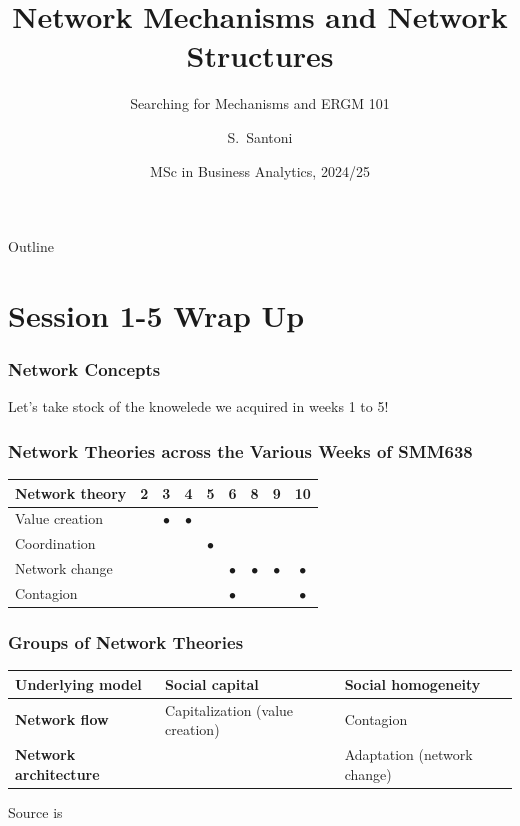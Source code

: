 \documentclass[show notes, aspectratio=1610]{beamer}
\title[Network Mechanisms]
{Network Mechanisms and Network Structures}
\subtitle{Searching for Mechanisms and ERGM 101}
\author{S.~Santoni\inst{1}}
\institute{
	\inst{1}%
	Bayes Business School
	}
\date{MSc in Business Analytics, 2024/25}
\begin{document}
\begin{frame}
	\titlepage
\end{frame}

\begin{frame}{Outline}
	\tableofcontents
\end{frame}

\section{Session 1-5 Wrap Up}

\begin{frame}
  \frametitle{Network Concepts}
  \centering
  \Large
  Let's take stock of the knowelede we acquired in weeks 1 to 5!
\end{frame}

\begin{frame}
	\frametitle{Network Theories across the Various Weeks of SMM638}
	\begin{table}
		\begin{tabular}[c]{l|c|c|c|c|c|c|c|c}
			\textbf{Network theory} & 
			\textbf{2} & 
			\textbf{3} & 
			\textbf{4} & 
			\textbf{5} & 
			\textbf{6} & 
			\textbf{8} & 
			\textbf{9} & 
			\textbf{10}\\
			\hline
			Value creation &  & $\bullet$ & $\bullet$ &           &           &  &           & \\
			Coordination   &  &           &           & $\bullet$ &           &  &           & \\
			Network change &  &           &           &           & $\bullet$ & $\bullet$ & $\bullet$ & $\bullet$\\
			Contagion      &  &           &           &           & $\bullet$ &  &           & $\bullet$ \\
		\end{tabular}
	\end{table}
\end{frame}

\begin{frame}
	\frametitle{Groups of Network Theories}
	\centering
	\small
	\begin{table}
		\begin{center}
			\begin{tabular}[c]{l|l|l}
				\textbf{Underlying model} & 
				\textbf{Social capital} &
				\textbf{Social homogeneity}\\
				\hline
				\textbf{Network flow} &
				Capitalization (value creation) & 
				Contagion  \\
				\hline
				\textbf{Network architecture} & 
				\cellcolor{blue!20}{\color{black}{Coordination}} & 
				Adaptation  (network change)\\
			\end{tabular}
		\end{center}
	\end{table}

	\vspace{1em}

	\raggedright \small Source is~\cite[][page 47]{scott2011}
\end{frame}
\end{document}
